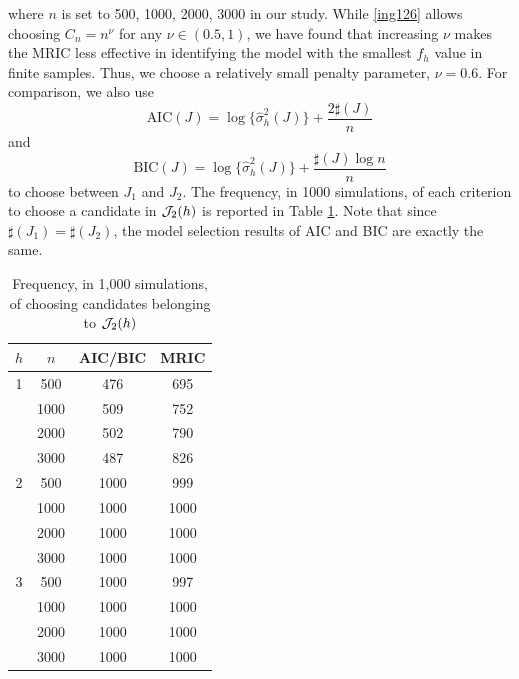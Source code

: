 \documentclass[ejsv2]{imsart}
\theoremstyle{plain}
\theoremstyle{definition}
\theoremstyle{remark}
\begin{document}
where $n$ is set to
500, 1000, 2000, 3000
in our study. While \eqref{ing126} allows choosing $C_n=n^{\nu}$ for any $\nu\in(0.5,1)$, we have found that increasing $\nu$ makes the MRIC less effective in identifying the model with the smallest $f_h$ value in finite samples. Thus, we choose a relatively small penalty parameter, $\nu=0.6$. 
For comparison, we also use
$$\textrm{AIC}(J)=\log\{\hat{\sigma}^2_{h}(J)\}+\frac{2\sharp(J)}{n}$$ and
$$\textrm{BIC}(J)=\log\{\hat{\sigma}^2_{h}(J)\}+\frac{\sharp(J)\log n}{n}$$
to choose between $J_1$ and $J_2$.
The frequency, in 1000 simulations, of
each criterion to choose a candidate in ${\cal J}_{2}(h)$ is reported
in Table \ref{tab3}.
Note that since $\sharp(J_1)=\sharp(J_2)$, the model selection results
of AIC and BIC are exactly the same.
\begin{table}
\caption{Frequency, in 1,000 simulations, of choosing candidates belonging to ${\cal J}_{2}(h)$}
\label{tab3}
\centering
\begin{tabular}{cccc}
   $h$ & $n$ & AIC/BIC & MRIC \\ \hline
   1 & 500 & 476 & 695 \\
    & 1000 & 509 & 752  \\
    & 2000 & 502 & 790  \\
    & 3000 & 487 & 826  \\ \hline
   2 & 500 & 1000 & 999  \\
    & 1000 & 1000 & 1000  \\
    & 2000 & 1000 & 1000  \\
    & 3000 & 1000 & 1000  \\ \hline
   3 & 500 & 1000 & 997  \\
    & 1000 & 1000 & 1000  \\
    & 2000 & 1000 & 1000  \\
    & 3000 & 1000 & 1000  \\ \hline
  \end{tabular}
\end{table}
\end{document}
